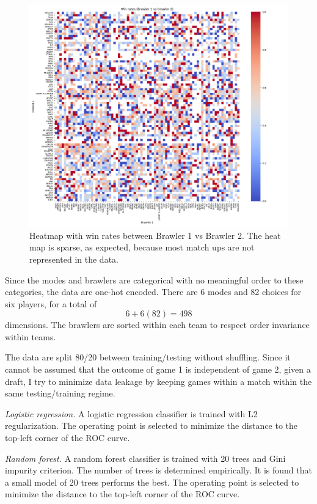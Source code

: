 \documentclass[12pt]{article}
\begin{document}
\begin{figure}[h!]
\centering
\includegraphics[width=6.5in]{../output/heatmap.png}
\caption{Heatmap with win rates between Brawler 1 vs Brawler 2. The heat map is sparse, as expected, because most match ups are not represented in the data.}
\label{fig:heatmap}
\end{figure}

Since the modes and brawlers are categorical with no meaningful order to these categories, the data are one-hot encoded. There are 6 modes and 82 choices for six players, for a total of 
$$6 + 6(82) = 498$$
dimensions. The brawlers are sorted within each team to respect order invariance within teams.

The data are split 80/20 between training/testing without shuffling. Since it cannot be assumed that the outcome of game 1 is independent of game 2, given a draft, I try to minimize data leakage by keeping games within a match within the same testing/training regime.

\textit{Logistic regression.} A logistic regression classifier is trained with L2 regularization. The operating point is selected to minimize the distance to the top-left corner of the ROC curve.

\textit{Random forest.} A random forest classifier is trained with 20 trees and Gini impurity criterion. The number of trees is determined empirically. It is found that a small model of 20 trees performs the best. The operating point is selected to minimize the distance to the top-left corner of the ROC curve.
\end{document}
